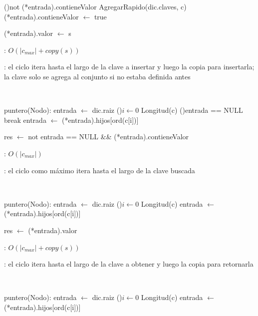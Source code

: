 \begin{Algoritmos}
\begin{algorithm}[H]
		\If(){not (*entrada).contieneValor} {
			AgregarRapido(dic.claves, c) 
			(*entrada).contieneValor $\leftarrow$ true 
		}

		(*entrada).valor $\leftarrow$ s 
	\end{algorithm}

	\complejidad: $O(|c_{max}| + copy(s))$

	\justifcomp: el ciclo itera hasta el largo de la clave a insertar y luego la copia para insertarla; la clave solo se agrega al conjunto si no estaba definida antes

	~

	\begin{algorithm}[H]
		\NoCaptionOfAlgo
		\caption{}
		puntero(Nodo): entrada $\leftarrow$ dic.raiz 
		\For(){$i \leftarrow 0$ \KwTo Longitud(c)}{
			\lIf(){entrada == NULL} {break}
			entrada $\leftarrow$ (*entrada).hijos[ord(c[i])] 
		}

		res $\leftarrow$ not entrada == NULL \&\& (*entrada).contieneValor 
	\end{algorithm}

	\complejidad: $O(|c_{max}|)$

	\justifcomp: el ciclo como máximo itera hasta el largo de la clave buscada

	~

	\begin{algorithm}[H]
		\NoCaptionOfAlgo
		\caption{}
		puntero(Nodo): entrada $\leftarrow$ dic.raiz 
		\For(){$i \leftarrow 0$ \KwTo Longitud(c)}{
			entrada $\leftarrow$ (*entrada).hijos[ord(c[i])] 
		}

		res $\leftarrow$ (*entrada).valor 
	\end{algorithm}

	\complejidad: $O(|c_{max}| + copy(s))$

	\justifcomp: el ciclo itera hasta el largo de la clave a obtener y luego la copia para retornarla

	~

	\begin{algorithm}[H]
		\NoCaptionOfAlgo
		\caption{}
		puntero(Nodo): entrada $\leftarrow$ dic.raiz 
		\For(){$i \leftarrow 0$ \KwTo Longitud(c)}{
			entrada $\leftarrow$ (*entrada).hijos[ord(c[i])] 
		}


\end{algorithm}
\end{Algoritmos}

